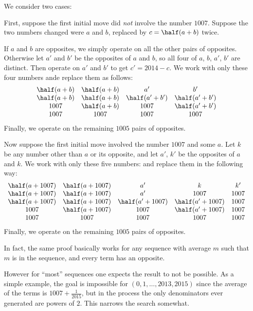 \documentclass[11pt]{scrartcl}
\begin{document}
We consider two cases:
\begin{itemize}
  \ii First, suppose the first initial move did
  \emph{not} involve the number $1007$.
  Suppose the two numbers changed were $a$ and $b$,
  replaced by $c = \half(a+b)$ twice.
  \begin{itemize}
    \ii If $a$ and $b$ are opposites, we
    simply operate on all the other pairs of opposites.
    \ii Otherwise let $a'$ and $b'$ be the opposites of $a$ and $b$,
    so all four of $a$, $b$, $a'$, $b'$ are distinct.
    Then operate on $a'$ and $b'$ to get $c' = 2014-c$.
    We work with only these four numbers ande replace them as
    follows:
    \[
      \begin{array}{cccc}
        \half(a+b) & \half(a+b) & a' & b' \\
        \half(a+b) & \half(a+b) & \half(a'+b') & \half(a'+b') \\
        1007 & \half(a+b) & 1007 & \half(a'+b') \\
        1007 & 1007 & 1007 & 1007
      \end{array}
    \]
    Finally, we operate on the remaining $1005$ pairs of opposites.
  \end{itemize}

  \ii Now suppose the first initial move involved the number $1007$
  and some $a$.
  Let $k$ be any number other than $a$ or its opposite,
  and let $a'$, $k'$ be the opposites of $a$ and $k$.
  We work with only these five numbers:
  and replace them in the following way:
  \[
    \begin{array}{ccccc}
      \half(a+1007) & \half(a+1007) & a' & k & k' \\
      \half(a+1007) & \half(a+1007) & a' & 1007 & 1007 \\
      \half(a+1007) & \half(a+1007) & \half(a'+1007) &
        \half(a'+1007) & 1007 \\
      1007 & \half(a+1007) & 1007 &
        \half(a'+1007) & 1007 \\
      1007 & 1007 & 1007 & 1007 & 1007 \\
    \end{array}
  \]
  Finally, we operate on the remaining $1005$ pairs of opposites.
\end{itemize}


\begin{remark*}
  In fact, the same proof basically works for any sequence
  with average $m$ such that $m$ is in the sequence,
  and every term has an opposite.

  However for ``most'' sequences one expects
  the result to not be possible.
  As a simple example,
  the goal is impossible for $(0, 1, \dots, 2013, 2015)$
  since the average of the terms is $1007 + \frac{1}{2015}$,
  but in the process the only denominators
  ever generated are powers of $2$.
  This narrows the search somewhat.
\end{remark*}
\pagebreak
\end{document}
